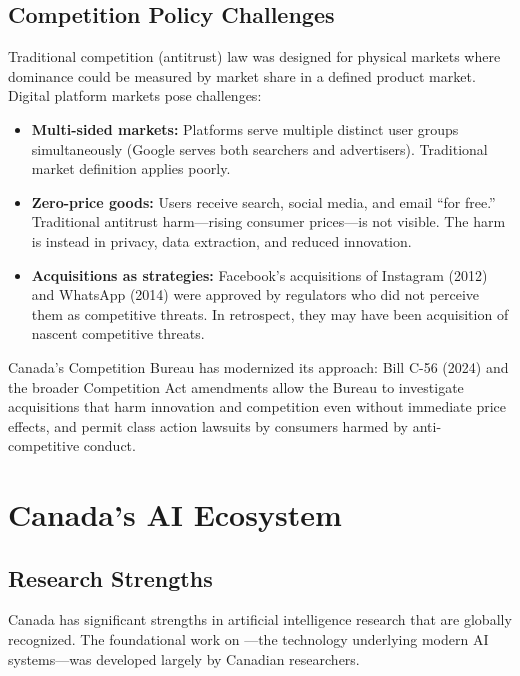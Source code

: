 \subsection{Competition Policy Challenges}

Traditional competition (antitrust) law was designed for physical markets where dominance could be measured by market share in a defined product market. Digital platform markets pose challenges:

\begin{itemize}
  \item \textbf{Multi-sided markets:} Platforms serve multiple distinct user groups simultaneously (Google serves both searchers and advertisers). Traditional market definition applies poorly.
  \item \textbf{Zero-price goods:} Users receive search, social media, and email ``for free.'' Traditional antitrust harm---rising consumer prices---is not visible. The harm is instead in privacy, data extraction, and reduced innovation.
  \item \textbf{Acquisitions as strategies:} Facebook's acquisitions of Instagram (2012) and WhatsApp (2014) were approved by regulators who did not perceive them as competitive threats. In retrospect, they may have been acquisition of nascent competitive threats.
\end{itemize}

Canada's Competition Bureau has modernized its approach: Bill C-56 (2024) and the broader Competition Act amendments allow the Bureau to investigate acquisitions that harm innovation and competition even without immediate price effects, and permit class action lawsuits by consumers harmed by anti-competitive conduct.

\section{Canada's AI Ecosystem}

\subsection{Research Strengths}

Canada has significant strengths in artificial intelligence research that are globally recognized. The foundational work on ---the technology underlying modern AI systems---was developed largely by Canadian researchers.

